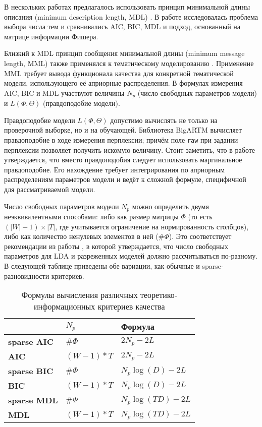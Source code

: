 В нескольких работах предлагалось  использовать принцип минимальной длины описания (minimum description length, MDL) \cite{image_segm,gerlach2018network}. В работе \cite{mml0} исследовалась проблема выбора числа тем и сравнивались AIC, BIC, MDL и подход, основанный на матрице информации Фишера.

Близкий к MDL принцип сообщения минимальной длины (minimum message length, MML) также применялся к тематическому моделированию \cite{mml1,mml2,mml3,mml4,mml5}.
Применение MML требует вывода функционала качества для конкретной тематической модели, использующего её априорные распределения. В формулах измерения AIC, BIC и MDL участвуют величины $N_p$ (число свободных параметров модели) и $L(\Phi,\Theta)$ (правдоподобие модели).

Правдоподобие модели $L(\Phi,\Theta)$ допустимо вычислять не только на проверочной выборке, но и на обучающей. Библиотека BigARTM вычисляет правдоподобие в ходе измерения перплексии; причём поле \texttt{raw} при задании перплексии позволяет получить искомую величину. Стоит заметить, что в работе \cite{gerlach2018network} утверждается, что вместо правдоподобия следует использовать маргинальное правдоподобие. Его нахождение требует интегрирования по априорным распределениям параметров модели и ведёт к сложной формуле, специфичной для рассматриваемой модели.

Число свободных параметров модели $N_p$ можно определить двумя неэквивалентными способами: либо как размер матрицы $\Phi$ (то есть $(|W|-1) \times |T|$, где учитывается ограничение на нормированность столбцов), либо как количество ненулевых элементов в ней ($\#\Phi$). Это соответствует рекомендации из работы \cite{than2012fully}, в которой утверждается, что число свободных параметров для LDA и разреженных моделей должно рассчитываться по-разному. В следующей таблице приведены обе вариации, как обычные и sparse-разновидности критериев.

\begin{table}[ht]
    \centering
    \begin{tabular}{|l|l|l|}
    \toprule
               & $N_p$       & Формула                                             \\
    \midrule
    \textbf{sparse AIC} & $\#\Phi$       & $2 N_p - 2 L$                \\
    \textbf{AIC}        & $(W - 1) * T$  & $2 N_p - 2 L$                \\ \hline
    \textbf{sparse BIC} & $\#\Phi$       & $N_p \log(D) - 2 L$          \\
    \textbf{BIC}        & $(W - 1) * T$  & $N_p \log(D) - 2 L$          \\ \hline
    \textbf{sparse MDL} & $\#\Phi$       & $N_p \log(TD) - 2 L$         \\
    \textbf{MDL}        & $(W - 1) * T$  & $N_p \log(TD) - 2 L$\\
    \bottomrule
    \end{tabular}
    \caption{Формулы вычисления различных теоретико-информационных критериев качества}
\end{table}


